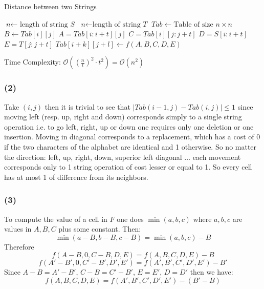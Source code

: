 \documentclass[10pt,a4paper]{article}
\begin{document}
\begin{algorithm}
\caption{Distance between two Strings}\label{ed}
\begin{algorithmic}[1]
\State $\textit{n} \gets \text{ length of string } \textit{S}$
\State $\textit{n} \gets \text{length of string } \textit{T}$
\State $\textit{Tab} \gets \text{Table }\text{of size } n \times n$
		\State $B \gets Tab [i][j]$
		\State $A = Tab[i : i+t] [j]$
	     \State $C = Tab[i] [j: j+t]$
	     \State $D = S[ i : i+t]$
	     \State $E = T [ j: j+ t]$
	    		 		\State $Tab[i+k][j+l] \gets f(A,B,C,D,E)$
				\EndFor
		\EndFor
	\EndFor
\EndFor
\EndProcedure
\end{algorithmic}
\end{algorithm}

Time Complexity: $\mathcal{O}((\frac{n}{t})^2 \cdot t^2) = \mathcal{O}(n^2)$


\subsubsection*{(2)}
Take $(i,j)$ then it is trivial to see that $|Tab(i - 1, j) - Tab(i, j)| \leq 1$ since moving left (resp. up, right and down) corresponds simply to a single string operation i.e. to go left, right, up or down one requires only one deletion or one insertion. Moving in diagonal corresponds to a replacement, which has a cost of 0 if the two characters of the alphabet are identical and 1 otherwise. So no matter the direction: left, up, right, down, superior left diagonal $\ldots$ each movement corresponds only to 1 string operation of cost lesser or equal to 1. So every cell has at most 1 of difference from its neighbors.

\subsubsection*{(3)}
To compute the value of a cell in $F$ one does $\min(a,b,c)$ where $a,b,c$ are values in $A,B,C$ plus some constant. Then:
$$\min (a-B, b-B, c-B) = \min(a,b,c) -B $$
Therefore
$$f(A - B,0,C-B,D,E)  = f(A,B,C,D,E)- B$$ 
$$f(A' - B',0,C'-B',D',E')  = f(A',B',C',D',E')- B' $$
Since $ A-B = A'-B', \, C-B = C'-B',\, E=E',\, D=D'$ then we have:
$$f(A, B,C,D,E) = f(A',B',C',D',E') - (B' - B)$$
\end{document}
